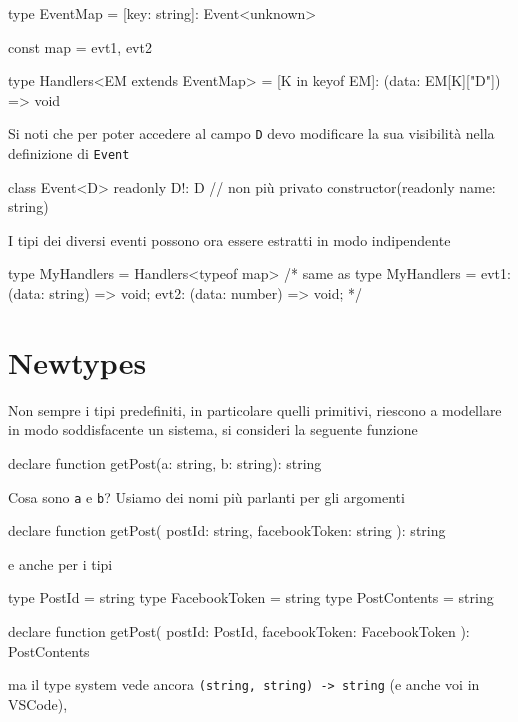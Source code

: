 \documentclass[12pt]{article}
\theoremstyle{definition}
\newenvironment{code}
  {\vspace{0.5cm} \VerbatimEnvironment\begin{typescriptcode}}
  {\end{typescriptcode} \vspace{0.2cm}}
\begin{document}
\begin{code}
type EventMap = { [key: string]: Event<unknown> }

const map = {
  evt1,
  evt2
}

type Handlers<EM extends EventMap> = {
  [K in keyof EM]: (data: EM[K]["D"]) => void
}
\end{code}

Si noti che per poter accedere al campo \texttt{D} devo modificare la sua visibilità nella definizione di \texttt{Event}

\begin{code}
class Event<D> {
  readonly D!: D // non più privato
  constructor(readonly name: string) {}
}
\end{code}

I tipi dei diversi eventi possono ora essere estratti in modo indipendente

\begin{code}
type MyHandlers = Handlers<typeof map>
/* same as
type MyHandlers = {
    evt1: (data: string) => void;
    evt2: (data: number) => void;
}
*/
\end{code}

\newpage
\section{Newtypes}

Non sempre i tipi predefiniti, in particolare quelli primitivi, riescono a modellare in modo soddisfacente un sistema,
si consideri la seguente funzione

\begin{code}
declare function getPost(a: string, b: string): string
\end{code}

Cosa sono \texttt{a} e \texttt{b}? Usiamo dei nomi più parlanti per gli argomenti

\begin{code}
declare function getPost(
  postId: string,
  facebookToken: string
): string
\end{code}

e anche per i tipi

\begin{code}
type PostId = string
type FacebookToken = string
type PostContents = string

declare function getPost(
  postId: PostId,
  facebookToken: FacebookToken
): PostContents
\end{code}

ma il type system vede ancora \texttt{(string, string) -> string} (e anche voi in VSCode),
\end{document}
